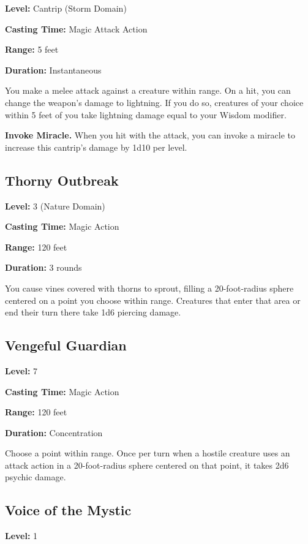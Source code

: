 \documentclass[12pt,letterpaper,twocolumn,openany,nodeprecatedcode,bg=none]{dndbook}
\begin{document}
\textbf{Level:} Cantrip (Storm Domain)

\textbf{Casting Time:} Magic Attack Action

\textbf{Range:} 5 feet

\textbf{Duration:} Instantaneous

You make a melee attack against a creature within range. On a hit, you
can change the weapon's damage to lightning. If you do so, creatures of
your choice within 5 feet of you take lightning damage equal to your
Wisdom modifier.

\textbf{Invoke Miracle.} When you hit with the attack, you can invoke a
miracle to increase this cantrip's damage by 1d10 per level.

\clearpage

\subsection{Thorny Outbreak}\label{thorny-outbreak}

\textbf{Level:} 3 (Nature Domain)

\textbf{Casting Time:} Magic Action

\textbf{Range:} 120 feet

\textbf{Duration:} 3 rounds

You cause vines covered with thorns to sprout, filling a 20-foot-radius
sphere centered on a point you choose within range. Creatures that enter
that area or end their turn there take 1d6 piercing damage.

\subsection{Vengeful Guardian}\label{vengeful-guardian}

\textbf{Level:} 7

\textbf{Casting Time:} Magic Action

\textbf{Range:} 120 feet

\textbf{Duration:} Concentration

Choose a point within range. Once per turn when a hostile creature uses
an attack action in a 20-foot-radius sphere centered on that point, it
takes 2d6 psychic damage.

\subsection{Voice of the Mystic}\label{voice-of-the-mystic}

\textbf{Level:} 1
\end{document}
